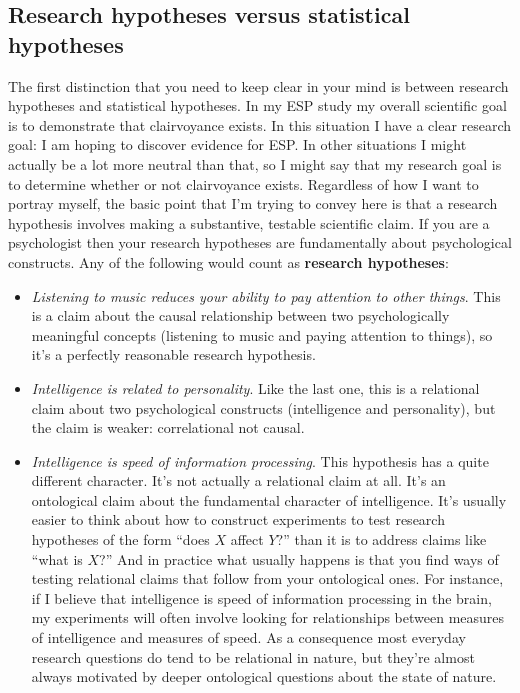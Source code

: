 \documentclass[
  a4paper,
]{book}
\providecommand{\tightlist}{%
  \setlength{\itemsep}{0pt}\setlength{\parskip}{0pt}}
\begin{document}
\subsection{Research hypotheses versus statistical
hypotheses}\label{research-hypotheses-versus-statistical-hypotheses}

The first distinction that you need to keep clear in your mind is
between research hypotheses and statistical hypotheses. In my ESP study
my overall scientific goal is to demonstrate that clairvoyance exists.
In this situation I have a clear research goal: I am hoping to discover
evidence for ESP. In other situations I might actually be a lot more
neutral than that, so I might say that my research goal is to determine
whether or not clairvoyance exists. Regardless of how I want to portray
myself, the basic point that I'm trying to convey here is that a
research hypothesis involves making a substantive, testable scientific
claim. If you are a psychologist then your research hypotheses are
fundamentally about psychological constructs. Any of the following would
count as \textbf{research hypotheses}:

\begin{itemize}
\tightlist
\item
  \emph{Listening to music reduces your ability to pay attention to
  other things}. This is a claim about the causal relationship between
  two psychologically meaningful concepts (listening to music and paying
  attention to things), so it's a perfectly reasonable research
  hypothesis.
\item
  \emph{Intelligence is related to personality}. Like the last one, this
  is a relational claim about two psychological constructs (intelligence
  and personality), but the claim is weaker: correlational not causal.
\item
  \emph{Intelligence is speed of information processing}. This
  hypothesis has a quite different character. It's not actually a
  relational claim at all. It's an ontological claim about the
  fundamental character of intelligence. It's usually easier to think
  about how to construct experiments to test research hypotheses of the
  form ``does \(X\) affect \(Y\)?'' than it is to address claims like
  ``what is \(X\)?'' And in practice what usually happens is that you
  find ways of testing relational claims that follow from your
  ontological ones. For instance, if I believe that intelligence is
  speed of information processing in the brain, my experiments will
  often involve looking for relationships between measures of
  intelligence and measures of speed. As a consequence most everyday
  research questions do tend to be relational in nature, but they're
  almost always motivated by deeper ontological questions about the
  state of nature.
\end{itemize}
\end{document}
